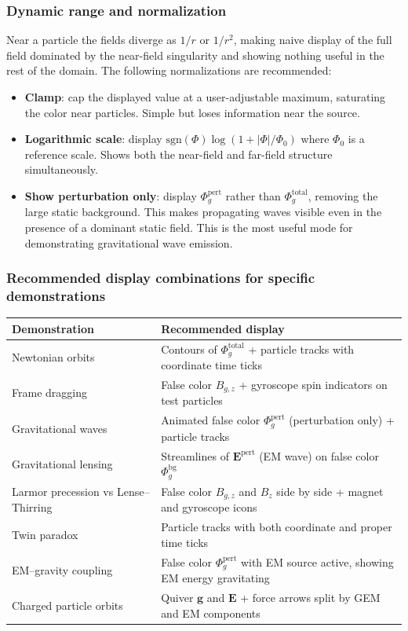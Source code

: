 \documentclass[11pt,a4paper]{article}
\newcommand{\vv}[1]{\mathbf{#1}}
\newcommand{\Phig}{\Phi_g}
\begin{document}
\subsubsection*{Dynamic range and normalization}

Near a particle the fields diverge as $1/r$ or $1/r^2$, making naive display of the full field dominated by the near-field singularity and showing nothing useful in the rest of the domain.  The following normalizations are recommended:

\begin{itemize}
  \item \textbf{Clamp}: cap the displayed value at a user-adjustable maximum, saturating the color near particles.  Simple but loses information near the source.
  \item \textbf{Logarithmic scale}: display $\mathrm{sgn}(\Phi)\log(1 + |\Phi|/\Phi_0)$ where $\Phi_0$ is a reference scale.  Shows both the near-field and far-field structure simultaneously.
  \item \textbf{Show perturbation only}: display $\Phig^{\mathrm{pert}}$ rather than $\Phig^{\mathrm{total}}$, removing the large static background.  This makes propagating waves visible even in the presence of a dominant static field.  This is the most useful mode for demonstrating gravitational wave emission.
\end{itemize}

\subsubsection*{Recommended display combinations for specific demonstrations}

\begin{center}
\begin{tabular}{@{}L{4cm}L{8cm}@{}}
\toprule
\textbf{Demonstration} & \textbf{Recommended display} \\
\midrule
Newtonian orbits & Contours of $\Phig^{\mathrm{total}}$ + particle tracks with coordinate time ticks \\
Frame dragging & False color $B_{g,z}$ + gyroscope spin indicators on test particles \\
Gravitational waves & Animated false color $\Phig^{\mathrm{pert}}$ (perturbation only) + particle tracks \\
Gravitational lensing & Streamlines of $\vv{E}^{\mathrm{pert}}$ (EM wave) on false color $\Phig^{\mathrm{bg}}$ \\
Larmor precession vs Lense--Thirring & False color $B_{g,z}$ and $B_z$ side by side + magnet and gyroscope icons \\
Twin paradox & Particle tracks with both coordinate and proper time ticks \\
EM--gravity coupling & False color $\Phig^{\mathrm{pert}}$ with EM source active, showing EM energy gravitating \\
Charged particle orbits & Quiver $\vv{g}$ and $\vv{E}$ + force arrows split by GEM and EM components \\
\bottomrule
\end{tabular}
\end{center}
\end{document}
